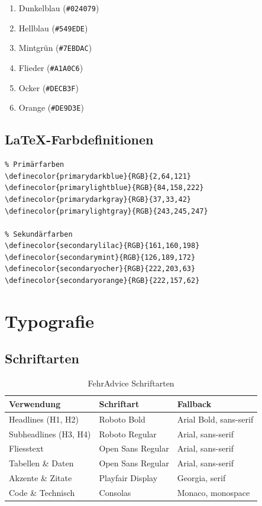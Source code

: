 \begin{enumerate}
    \item Dunkelblau (\texttt{\#024079})
    \item Hellblau (\texttt{\#549EDE})
    \item Mintgrün (\texttt{\#7EBDAC})
    \item Flieder (\texttt{\#A1A0C6})
    \item Ocker (\texttt{\#DECB3F})
    \item Orange (\texttt{\#DE9D3E})
\end{enumerate}

\subsection{LaTeX-Farbdefinitionen}

\begin{verbatim}
% Primärfarben
\definecolor{primarydarkblue}{RGB}{2,64,121}
\definecolor{primarylightblue}{RGB}{84,158,222}
\definecolor{primarydarkgray}{RGB}{37,33,42}
\definecolor{primarylightgray}{RGB}{243,245,247}

% Sekundärfarben
\definecolor{secondarylilac}{RGB}{161,160,198}
\definecolor{secondarymint}{RGB}{126,189,172}
\definecolor{secondaryocher}{RGB}{222,203,63}
\definecolor{secondaryorange}{RGB}{222,157,62}
\end{verbatim}


\section{Typografie}
\label{sec:sg-typography}

\subsection{Schriftarten}

\begin{table}[h]
\centering
\caption{FehrAdvice Schriftarten}
\label{tab:fonts}
\begin{tabular}{lll}
\toprule
\textbf{Verwendung} & \textbf{Schriftart} & \textbf{Fallback} \\
\midrule
Headlines (H1, H2) & Roboto Bold & Arial Bold, sans-serif \\
Subheadlines (H3, H4) & Roboto Regular & Arial, sans-serif \\
Fliesstext & Open Sans Regular & Arial, sans-serif \\
Tabellen \& Daten & Open Sans Regular & Arial, sans-serif \\
Akzente \& Zitate & Playfair Display & Georgia, serif \\
Code \& Technisch & Consolas & Monaco, monospace \\
\bottomrule
\end{tabular}
\end{table}


